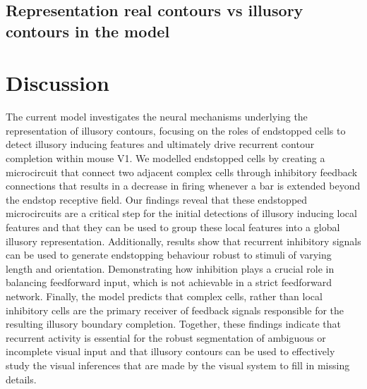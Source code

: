 \documentclass[12pt]{article}
\begin{document}
\subsection{Representation real contours vs illusory contours in the model}


\newpage
\section{Discussion}
The current model investigates the neural mechanisms underlying the representation of illusory contours, focusing on the roles of endstopped cells to detect illusory inducing features and ultimately drive recurrent contour completion within mouse V1. We modelled endstopped cells by creating a microcircuit that connect two adjacent complex cells through inhibitory feedback connections that results in a decrease in firing whenever a bar is extended beyond the endstop receptive field. Our findings reveal that these endstopped microcircuits are a critical step for the initial detections of illusory inducing local features and that they can be used to group these local features into a global illusory representation. Additionally, results show that recurrent inhibitory signals can be used to generate endstopping behaviour robust to stimuli of varying length and orientation. Demonstrating how inhibition plays a crucial role in balancing feedforward input, which is not achievable in a strict feedforward network. Finally, the model predicts that complex cells, rather than local inhibitory cells are the primary receiver of feedback signals responsible for the resulting illusory boundary completion. Together, these findings indicate that recurrent activity is essential for the robust segmentation of ambiguous or incomplete visual input and that illusory contours can be used to effectively study the visual inferences that are made by the visual system to fill in missing details.

\end{document}
